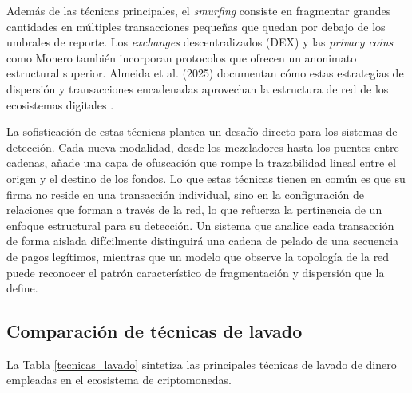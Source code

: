 Además de las técnicas principales, el \textit{smurfing} consiste en fragmentar grandes cantidades en múltiples transacciones pequeñas que quedan por debajo de los umbrales de reporte. Los \textit{exchanges} descentralizados (DEX) y las \textit{privacy coins} como Monero también incorporan protocolos que ofrecen un anonimato estructural superior. Almeida et al. (2025) documentan cómo estas estrategias de dispersión y transacciones encadenadas aprovechan la estructura de red de los ecosistemas digitales \cite{Almeida2025FromTechniques}.

La sofisticación de estas técnicas plantea un desafío directo para los sistemas de detección. Cada nueva modalidad, desde los mezcladores hasta los puentes entre cadenas, añade una capa de ofuscación que rompe la trazabilidad lineal entre el origen y el destino de los fondos. Lo que estas técnicas tienen en común es que su firma no reside en una transacción individual, sino en la configuración de relaciones que forman a través de la red, lo que refuerza la pertinencia de un enfoque estructural para su detección. Un sistema que analice cada transacción de forma aislada difícilmente distinguirá una cadena de pelado de una secuencia de pagos legítimos, mientras que un modelo que observe la topología de la red puede reconocer el patrón característico de fragmentación y dispersión que la define.

\subsection{Comparación de técnicas de lavado}

La Tabla \ref{tecnicas_lavado} sintetiza las principales técnicas de lavado de dinero empleadas en el ecosistema de criptomonedas.

